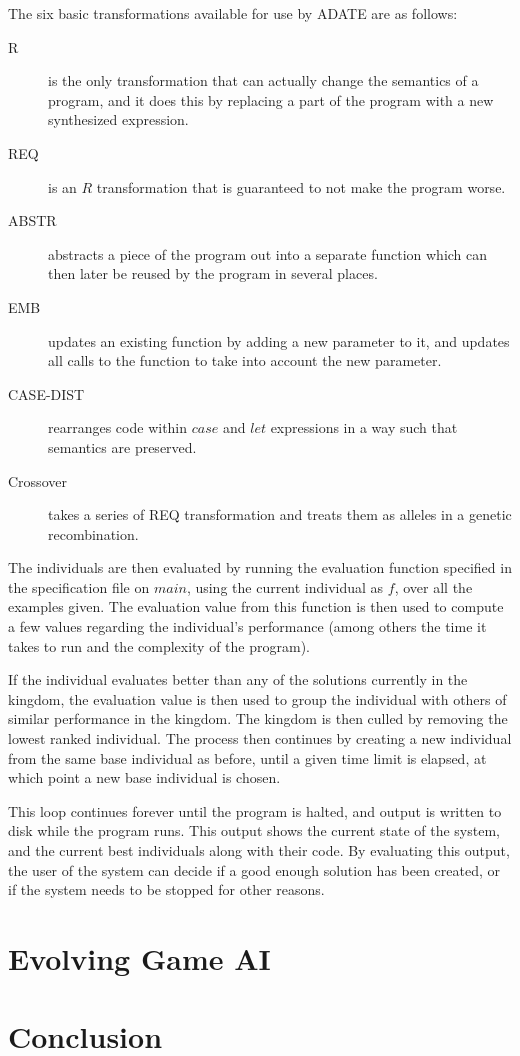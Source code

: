 \documentclass[]{report}
\begin{document}
The six basic transformations available for use by ADATE are as follows:
\begin{description}
\item[R] is the only transformation that can actually change the semantics of a
  program, and it does this by replacing a part of the program with a new
  synthesized expression.
\item[REQ] is an \(R\) transformation that is guaranteed to not make the program
  worse.
\item[ABSTR] abstracts a piece of the program out into a separate function which
  can then later be reused by the program in several places.
\item[EMB] updates an existing function by adding a new parameter to it, and
  updates all calls to the function to take into account the new parameter.
\item[CASE-DIST] rearranges code within \(case\) and \(let\) expressions in a
  way such that semantics are preserved.
\item[Crossover] takes a series of REQ transformation and treats them as alleles
  in a genetic recombination.
\end{description}

The individuals are then evaluated by running the evaluation function specified
in the specification file on \(main\), using the current individual as \(f\),
over all the examples given. The evaluation value from this function is then
used to compute a few values regarding the individual's performance (among others
the time it takes to run and the complexity of the program).

If the individual evaluates better than any of the solutions currently in the
kingdom, the evaluation value is then used to group the individual with others
of similar performance in the kingdom. The kingdom is then culled by removing
the lowest ranked individual. The process then continues by creating a new
individual from the same base individual as before, until a given time limit is
elapsed, at which point a new base individual is chosen.

This loop continues forever until the program is halted, and output is written
to disk while the program runs. This output shows the current state of the
system, and the current best individuals along with their code. By evaluating
this output, the user of the system can decide if a good enough solution has
been created, or if the system needs to be stopped for other reasons.

\chapter{Evolving Game AI}
\label{cha:game-ai-via}

\chapter{Conclusion}
\label{cha:conclusion}



\end{document}
